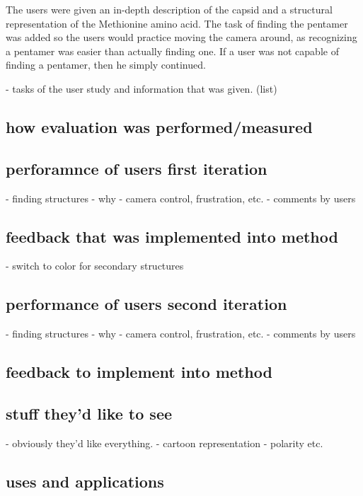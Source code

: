 \documentclass[review,journal]{vgtc}         %
\begin{document}
The users were given an in-depth description of the capsid and a structural representation of the Methionine amino acid. The task of finding the pentamer was added so the users would practice moving the camera around, as recognizing a pentamer was easier than actually finding one.  If a user was not capable of finding a pentamer, then he simply continued. 

- tasks of the user study and information that was given. (list)






\subsection{how evaluation was performed/measured}


\subsection{perforamnce of users first iteration}
- finding structures
	- why
- camera control, frustration, etc.
- comments by users




\subsection{feedback that was implemented into method}
- switch to color for secondary structures


\subsection{performance of users second iteration}
- finding structures
- why
- camera control, frustration, etc.
- comments by users




\subsection{feedback to implement into method}


\subsection{stuff they'd like to see}
- obviously they'd like everything.
- cartoon representation
- polarity etc.


\subsection{uses and applications}
\end{document}
